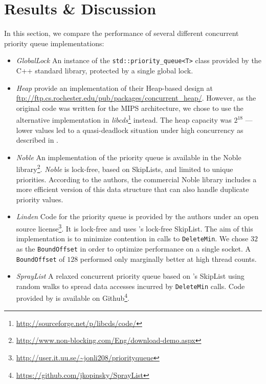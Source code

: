 \chapter{Results \& Discussion} \label{ch:evaluation}

In this section, we compare the performance of several different concurrent priority
queue implementations:

\begin{itemize}
\item \textit{GlobalLock} An instance of the \lstinline|std::priority_queue<T>| class provided
      by the C++ standard library, protected by a single global lock.
\item \textit{Heap} \citeauthor{hunt1996efficient} provide an implementation
      of their Heap-based design \cite{hunt1996efficient} at \url{ftp://ftp.cs.rochester.edu/pub/packages/concurrent_heap/}.
      However, as the original code was written for the MIPS architecture, we chose to
      use the alternative implementation in \emph{libcds}\footnote{\url{http://sourceforge.net/p/libcds/code/}}
      instead. The heap capacity was $2^{18}$ --- lower values led to a quasi-deadlock situation under high concurrency
      as described in \cite{dragicevic2008survey}.
\item \textit{Noble} An implementation of the \citeauthor{sundell2003fast} priority queue \cite{sundell2003fast}
      is available in the Noble library\footnote{\url{http://www.non-blocking.com/Eng/download-demo.aspx}}.
      \textit{Noble} is lock-free, based on SkipLists, and limited to unique priorities.
      According to the authors, the commercial Noble library includes a more efficient
      version of this data structure that can also handle duplicate priority values.
\item \textit{Linden} Code for the \citeauthor{linden2013skiplist} priority queue \cite{linden2013skiplist}
      is provided by the authors under an open source license\footnote{\url{http://user.it.uu.se/~jonli208/priorityqueue}}.
      It is lock-free and uses \citeauthor{fraser2004practical}'s lock-free
      SkipList. The aim of this implementation is to minimize contention in
      calls to \lstinline|DeleteMin|. We chose $32$ as the \lstinline|BoundOffset| in order to optimize
      performance on a single socket. A \lstinline|BoundOffset| of $128$ performed only marginally better
      at high thread counts.
\item \textit{SprayList} A relaxed concurrent priority queue based on \citeauthor{fraser2004practical}'s
      SkipList using random walks to spread data accesses
      incurred by \lstinline|DeleteMin| calls. Code provided by \citeauthor{alistarhspraylist} is
      available on Github\footnote{\url{https://github.com/jkopinsky/SprayList}}.
\end{itemize}

